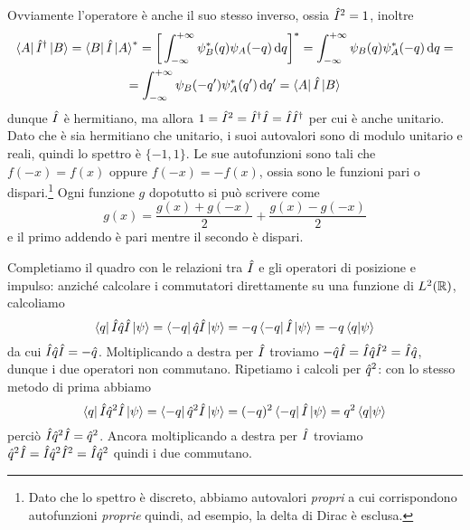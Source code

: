 Ovviamente l'operatore è anche il suo stesso inverso, ossia $\hat{I}^2=1$, inoltre
\begin{multline}
	\left\langle{A}\right|{\hat{I}}^\dagger\left|{B}\right\rangle=\left\langle{B}\right|\hat{I}\left|{A}\right\rangle^*=\bigg[\int_{-\infty}^{+\infty}\psi_B^*(q)\psi_A(-q)\,\textup{d} q\bigg]^*=\int_{-\infty}^{+\infty}\psi_B(q)\psi_A^*(-q)\,\textup{d} q=\\
	=\int_{-\infty}^{+\infty}\psi_B(-q')\psi_A^*(q')\,\textup{d} q'=\left\langle{A}\right|\hat{I}\left|{B}\right\rangle
	\label{eq:operatore-inversione-spaziale-hermitiano}
\end{multline}
dunque $\hat{I}$ è hermitiano, ma allora $1=\hat{I}^2={\hat{I}}^\dagger\hat{I}=\hat{I}{\hat{I}}^\dagger$ per cui è anche unitario.
Dato che è sia hermitiano che unitario, i suoi autovalori sono di modulo unitario e reali, quindi lo spettro è $\{-1,1\}$.
Le sue autofunzioni sono tali che $f(-x)=f(x)$ oppure $f(-x)=-f(x)$, ossia sono le funzioni pari o dispari.\footnote{Dato che lo spettro è discreto, abbiamo autovalori \emph{propri} a cui corrispondono autofunzioni \emph{proprie} quindi, ad esempio, la delta di Dirac è esclusa.}
Ogni funzione $g$ dopotutto si può scrivere come
\begin{equation}
	g(x)=\frac{g(x)+g(-x)}2+\frac{g(x)-g(-x)}2
	\label{eq:decomposizione-funzione-pari-dispari}
\end{equation}
e il primo addendo è pari mentre il secondo è dispari.

Completiamo il quadro con le relazioni tra $\hat{I}$ e gli operatori di posizione e impulso: anzich\'e calcolare i commutatori direttamente su una funzione di $L^2(\mathbb{R})$, calcoliamo
\begin{equation}
	\left\langle{q}\right|\hat{I}\hat{q}\hat{I}\left|{\psi}\right\rangle=\left\langle{-q}\right|\hat{q}\hat{I}\left|{\psi}\right\rangle=-q\left\langle{-q}\right|\hat{I}\left|{\psi}\right\rangle=-q\left\langle{q}\middle|{\psi}\right\rangle
\end{equation}
da cui $\hat{I}\hat{q}\hat{I}=-\hat{q}$.
Moltiplicando a destra per $\hat{I}$ troviamo $-\hat{q}\hat{I}=\hat{I}\hat{q}\hat{I}^2=\hat{I}\hat{q}$, dunque i due operatori non commutano.
Ripetiamo i calcoli per $\hat{q}^2$: con lo stesso metodo di prima abbiamo
\begin{equation}
	\left\langle{q}\right|\hat{I}\hat{q}^2\hat{I}\left|{\psi}\right\rangle=\left\langle{-q}\right|\hat{q}^2\hat{I}\left|{\psi}\right\rangle=(-q)^2\left\langle{-q}\right|\hat{I}\left|{\psi}\right\rangle=q^2\left\langle{q}\middle|{\psi}\right\rangle
\end{equation}
perciò $\hat{I}\hat{q}^2\hat{I}=\hat{q}^2$.
Ancora moltiplicando a destra per $\hat{I}$ troviamo $\hat{q}^2\hat{I}=\hat{I}\hat{q}^2\hat{I}^2=\hat{I}\hat{q}^2$ quindi i due commutano.

